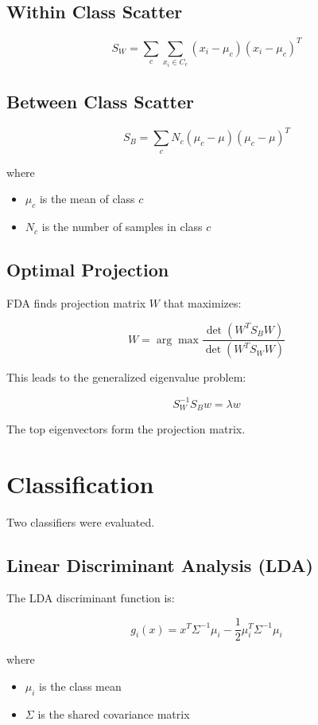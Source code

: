 \documentclass[12pt]{article}
\begin{document}
\subsection{Within Class Scatter}

\[
S_W = \sum_c \sum_{x_i \in C_c} (x_i - \mu_c)(x_i - \mu_c)^T
\]

\subsection{Between Class Scatter}

\[
S_B = \sum_c N_c(\mu_c - \mu)(\mu_c - \mu)^T
\]

where

\begin{itemize}
\item $\mu_c$ is the mean of class $c$
\item $N_c$ is the number of samples in class $c$
\end{itemize}

\subsection{Optimal Projection}

FDA finds projection matrix $W$ that maximizes:

\[
W = \arg\max \frac{\det(W^T S_B W)}{\det(W^T S_W W)}
\]

This leads to the generalized eigenvalue problem:

\[
S_W^{-1}S_B w = \lambda w
\]

The top eigenvectors form the projection matrix.

\section{Classification}

Two classifiers were evaluated.

\subsection{Linear Discriminant Analysis (LDA)}

The LDA discriminant function is:

\[
g_i(x) = x^T\Sigma^{-1}\mu_i - \frac{1}{2}\mu_i^T\Sigma^{-1}\mu_i
\]

where

\begin{itemize}
\item $\mu_i$ is the class mean
\item $\Sigma$ is the shared covariance matrix
\end{itemize}
\end{document}
